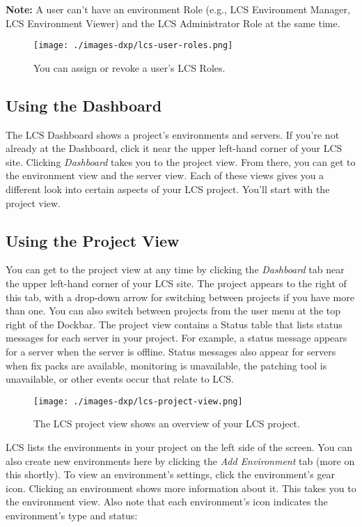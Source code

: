 \noindent\hrulefill

\textbf{Note:} A user can't have an environment Role (e.g., LCS
Environment Manager, LCS Environment Viewer) and the LCS Administrator
Role at the same time.

\noindent\hrulefill

\begin{figure}
\centering
\texttt{[image: ./images-dxp/lcs-user-roles.png]}
\caption{You can assign or revoke a user's LCS Roles.}
\end{figure}

\subsection{Using the Dashboard}\label{using-the-dashboard}

The LCS Dashboard shows a project's environments and servers. If you're
not already at the Dashboard, click it near the upper left-hand corner
of your LCS site. Clicking \emph{Dashboard} takes you to the project
view. From there, you can get to the environment view and the server
view. Each of these views gives you a different look into certain
aspects of your LCS project. You'll start with the project view.

\subsection{Using the Project View}\label{using-the-project-view}

You can get to the project view at any time by clicking the
\emph{Dashboard} tab near the upper left-hand corner of your LCS site.
The project appears to the right of this tab, with a drop-down arrow for
switching between projects if you have more than one. You can also
switch between projects from the user menu at the top right of the
Dockbar. The project view contains a Status table that lists status
messages for each server in your project. For example, a status message
appears for a server when the server is offline. Status messages also
appear for servers when fix packs are available, monitoring is
unavailable, the patching tool is unavailable, or other events occur
that relate to LCS.

\begin{figure}
\centering
\texttt{[image: ./images-dxp/lcs-project-view.png]}
\caption{The LCS project view shows an overview of your LCS project.}
\end{figure}

LCS lists the environments in your project on the left side of the
screen. You can also create new environments here by clicking the
\emph{Add Environment} tab (more on this shortly). To view an
environment's settings, click the environment's gear icon. Clicking an
environment shows more information about it. This takes you to the
environment view. Also note that each environment's icon indicates the
environment's type and status:

